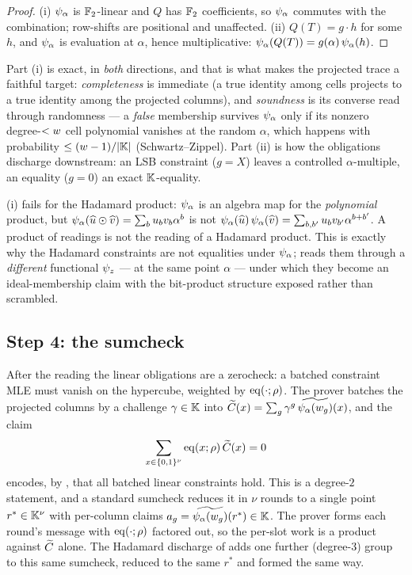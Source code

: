 \begin{proof}
(i) $\psi_{\alpha}$ is $\mathbb{F}_2$-linear and $Q$ has $\mathbb{F}_2$ coefficients, so $\psi_{\alpha}$
commutes with the combination; row-shifts are positional and unaffected.
(ii) $Q(T) = g\cdot h$ for some $h$, and $\psi_{\alpha}$ is evaluation at $\alpha$, hence
multiplicative: $\psi_{\alpha}(Q(T)) = g(\alpha)\,\psi_{\alpha}(h)$.
\end{proof}

Part (i) is exact, in \emph{both} directions, and that is what makes the
projected trace a faithful target: \emph{completeness} is immediate (a true
identity among cells projects to a true identity among the projected columns),
and \emph{soundness} is its converse read through randomness --- a \emph{false}
membership survives $\psi_{\alpha}$ only if its nonzero degree-$<w$ cell polynomial
vanishes at the random $\alpha$, which happens with probability
$\le(w-1)/|\mathbb{K}|$ (Schwartz--Zippel). Part (ii) is how the obligations
discharge downstream: an LSB constraint ($g = X$) leaves a controlled
$\alpha$-multiple, an equality ($g = 0$) an exact $\mathbb{K}$-equality.

\begin{remark}
\label{rem:and-not-survive}
(i) fails for the Hadamard product: $\psi_{\alpha}$ is an
algebra map for the \emph{polynomial} product, but
$\psi_{\alpha}(\widehat{u}\odot\widehat{v}) = \sum_b u_b v_b\alpha^b$ is not
$\psi_{\alpha}(\widehat{u})\,\psi_{\alpha}(\widehat{v}) = \sum_{b,b'} u_b v_{b'}\alpha^{b+b'}$. A product
of readings is not the reading of a Hadamard product. This is exactly why the
Hadamard constraints are not equalities under $\psi_{\alpha}$;  reads
them through a \emph{different} functional $\psi_{z}$ --- at the same point
$\alpha$ --- under which they become an ideal-membership claim with the
bit-product structure exposed rather than scrambled.
\end{remark}

\subsection{Step 4: the sumcheck}
\label{sec:sumcheck}

After the reading the linear obligations are a zerocheck: a batched constraint
MLE must vanish on the hypercube, weighted by $\operatorname{eq}(\cdot;\rho)$. The prover
batches the projected columns by a challenge $\gamma\in\mathbb{K}$ into
$\widetilde{C}(x) = \sum_g \gamma^{g}\,\widetilde{\psi_{\alpha}(w_g)}(x)$, and the claim
\[
  \sum_{x\in\{0,1\}^{\nu}} \operatorname{eq}(x;\rho)\,\widetilde{C}(x) = 0
\]
encodes, by , that all batched linear constraints
hold. This is a degree-$2$ statement, and a standard sumcheck reduces it in
$\nu$ rounds to a single point $r^*\in\mathbb{K}^{\nu}$ with per-column claims
$a_g = \widetilde{\psi_{\alpha}(w_g)}(r^*)\in\mathbb{K}$. The prover forms each round's message with
$\operatorname{eq}(\cdot;\rho)$ factored out, so the per-slot work is a product against
$\widetilde{C}$ alone. The Hadamard discharge of  adds one further
(degree-$3$) group to this same sumcheck, reduced to the same $r^*$ and formed
the same way.

